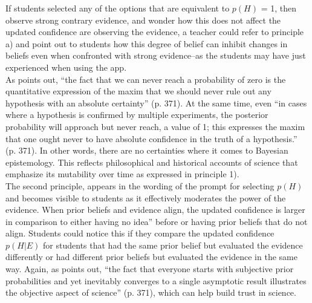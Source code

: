 \documentclass[man, floatsintext]{apa7} %
\begin{document}
If students selected any of the options that are equivalent to $p(H)$ = 1, then observe strong contrary evidence, and wonder how this does not affect the updated confidence are observing the evidence, a teacher could refer to principle a) and point out to students how this degree of belief can inhibit changes in beliefs even when confronted with strong evidence--as the students may have just experienced when using the app. \\

As \textcite{warren_quantitative_2018} points out, ``the fact that we can never reach a probability of zero is the quantitative expression of the maxim that we should never rule out any hypothesis with an absolute certainty'' (p. 371). At the same time, even ``in cases where a hypothesis is confirmed by multiple experiments, the posterior probability will approach but never reach, a value of 1; this expresses the maxim that one ought never to have absolute confidence in the truth of a hypothesis.'' (p. 371). In other words, there are no certainties where it comes to Bayesian epistemology. This reflects philosophical and historical accounts of science that emphasize its mutability over time \parencite{Kuhn1962} as expressed in principle 1). \\

The second principle,  appears in the wording of the prompt for selecting $p(H)$ and becomes visible to students as it effectively moderates the power of the evidence. When prior beliefs and evidence align, the updated confidence is larger in comparison to either having no idea” before or having prior beliefs that do not align. Students could notice this if they compare the updated confidence $p(H|E)$ for students that had the same prior belief but evaluated the evidence differently or had different prior beliefs but evaluated the evidence in the same way. Again, as \textcite{warren_quantitative_2018} points out, “the fact that everyone starts with subjective prior probabilities and yet inevitably converges to a single asymptotic result illustrates the objective aspect of science” (p. 371), which can help build trust in science. \\
\end{document}
